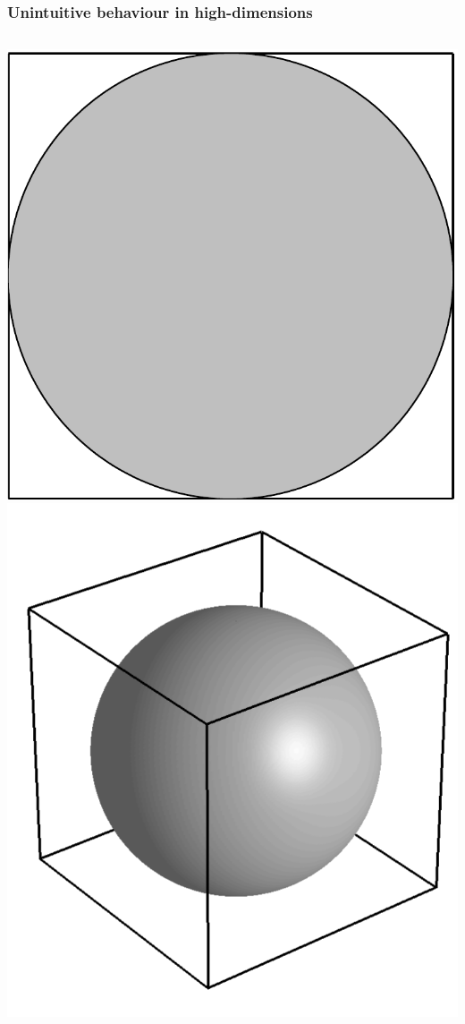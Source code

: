 \begin{frame}
\frametitle{Unintuitive behaviour in high-dimensions}
\begin{columns}[c]
\includegraphics[width=\textwidth]{circle}
\includegraphics[width=\textwidth]{sphere}
\end{columns}
\end{frame}




